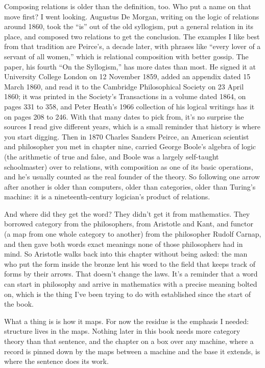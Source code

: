 \documentclass[11pt,twoside]{article}
\theoremstyle{thielethm}
\theoremstyle{thieledef}
\theoremstyle{thieledef}
\theoremstyle{thieledef}
\theoremstyle{thielethm}
\theoremstyle{thieleobs}
\theoremstyle{thielethm}
\begin{document}
Composing relations is older than the definition, too. Who put a name on that move first? I went looking. Augustus De Morgan, writing on the logic of relations around 1860, took the ``is'' out of the old syllogism, put a general relation in its place, and composed two relations to get the conclusion. The examples I like best from that tradition are Peirce's, a decade later, with phrases like ``every lover of a servant of all women,'' which is relational composition with better gossip. The paper, his fourth ``On the Syllogism,'' has more dates than most. He signed it at University College London on 12 November 1859, added an appendix dated 15 March 1860, and read it to the Cambridge Philosophical Society on 23 April 1860; it was printed in the Society's Transactions in a volume dated 1864, on pages 331 to 358, and Peter Heath's 1966 collection of his logical writings has it on pages 208 to 246. With that many dates to pick from, it's no surprise the sources I read give different years, which is a small reminder that history is where you start digging. Then in 1870 Charles Sanders Peirce, an American scientist and philosopher you met in chapter nine, carried George Boole's algebra of logic (the arithmetic of true and false, and Boole was a largely self-taught schoolmaster) over to relations, with composition as one of its basic operations, and he's usually counted as the real founder of the theory. So following one arrow after another is older than computers, older than categories, older than Turing's machine: it is a nineteenth-century logician's product of relations.

And where did they get the word? They didn't get it from mathematics. They borrowed category from the philosophers, from Aristotle and Kant, and functor (a map from one whole category to another) from the philosopher Rudolf Carnap, and then gave both words exact meanings none of those philosophers had in mind. So Aristotle walks back into this chapter without being asked: the man who put the form inside the bronze lent his word to the field that keeps track of forms by their arrows. That doesn't change the laws. It's a reminder that a word can start in philosophy and arrive in mathematics with a precise meaning bolted on, which is the thing I've been trying to do with established since the start of the book.

What a thing is is how it maps. For now the residue is the emphasis I needed: structure lives in the maps. Nothing later in this book needs more category theory than that sentence, and the chapter on a box over any machine, where a record is pinned down by the maps between a machine and the base it extends, is where the sentence does its work.
\end{document}
